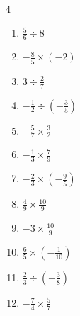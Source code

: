 \begin{multicols}{4}
\begin{enumerate}
  \item $\displaystyle \frac{5}{6}\div{}8$


  \item $\displaystyle -\frac{8}{5}\times{}\left(-2\right)$


  \item $\displaystyle 3\div{}\frac{2}{7}$


  \item $\displaystyle -\frac{1}{2}\div{}\left(-\frac{3}{5}\right)$


  \item $\displaystyle -\frac{5}{7}\times{}\frac{3}{2}$


\columnbreak %

  \item $\displaystyle -\frac{1}{3}\times{}\frac{7}{9}$


  \item $\displaystyle -\frac{2}{3}\times{}\left(-\frac{9}{5}\right)$


  \item $\displaystyle \frac{4}{9}\times{}\frac{10}{9}$


  \item $\displaystyle -3\times{}\frac{10}{9}$


  \item $\displaystyle \frac{6}{5}\times{}\left(-\frac{1}{10}\right)$


  \item $\displaystyle \frac{2}{3}\div{}\left(-\frac{3}{8}\right)$


  \item $\displaystyle -\frac{7}{4}\times{}\frac{5}{7}$


\end{enumerate}
\end{multicols}
